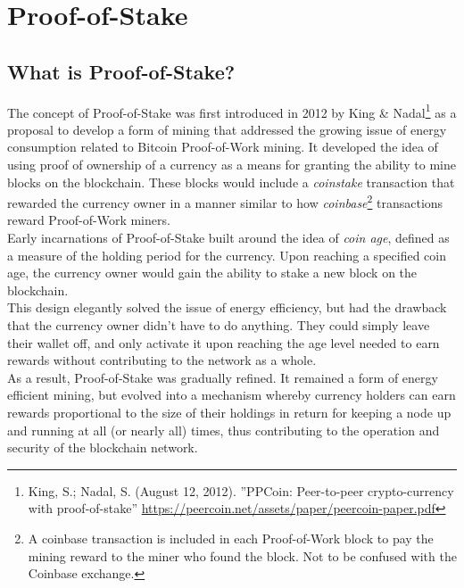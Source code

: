 \documentclass[11pt]{article}
\begin{document}
\bigskip

\section{Proof-of-Stake}

\subsection{What is Proof-of-Stake?}
The concept of Proof-of-Stake was first introduced in 2012 by King \& Nadal\footnote{King, S.; Nadal, S. (August 12, 2012). ”PPCoin: Peer-to-peer crypto-currency  with  proof-of-stake” \url{https://peercoin.net/assets/paper/peercoin-paper.pdf}} as a proposal to develop a form of mining that addressed the growing issue of energy consumption related to Bitcoin Proof-of-Work mining. It developed the idea of using proof of ownership of a currency as a means for granting the ability to mine blocks on the blockchain. These blocks would include a \textit{coinstake} transaction that rewarded the currency owner in a manner similar to how \textit{coinbase}\footnote{A coinbase transaction is included in each Proof-of-Work block to pay the mining reward to the miner who found the block. Not to be confused with the Coinbase exchange.} transactions reward Proof-of-Work miners.\\

\noindent Early incarnations of Proof-of-Stake built around the idea of \textit{coin age}, defined as a measure of the holding period for the currency. Upon reaching a specified coin age, the currency owner would gain the ability to stake a new block on the blockchain.\\

\noindent This design elegantly solved the issue of energy efficiency, but had the drawback that the currency owner didn't have to do anything. They could simply leave their wallet off, and only activate it upon reaching the age level needed to earn rewards without contributing to the network as a whole.\\

\noindent As a result, Proof-of-Stake was gradually refined. It remained a form of energy efficient mining, but evolved into a mechanism whereby currency holders can earn rewards proportional to the size of their holdings in return for keeping a node up and running at all (or nearly all) times, thus contributing to the operation and security of the blockchain network.\\
\end{document}
